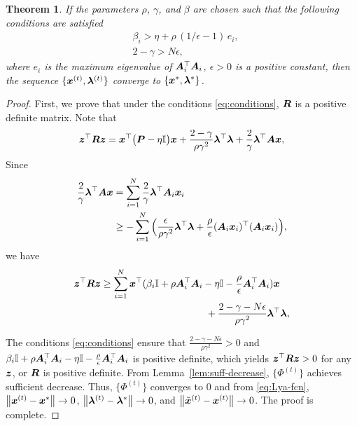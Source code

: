 \documentclass[twocolumn,amsthm]{autart}%
\theoremstyle{definition}
\theoremstyle{plain}
\newtheorem{theorem}{Theorem}
\begin{document}
\begin{theorem}
If the parameters $\rho$, $\gamma$, and $\beta$ are chosen such that the following conditions are satisfied
\begin{equation}
\label{eq:conditions}
\begin{split}
& \beta_i > \eta + \rho\, (1/\epsilon-1)\, e_i, \\
& 2-\gamma > N \epsilon,
\end{split}
\end{equation}
where $e_i$ is the maximum eigenvalue of $\boldsymbol{A}_i^\top \boldsymbol{A}_i$, $\epsilon > 0$ is a positive constant,
then the sequence $\{\boldsymbol{x}^{(t)} , \boldsymbol{\lambda}^{(t)}\}$ converge to $\{\boldsymbol{x}^{*} , \boldsymbol{\lambda}^{*} \}$.
\end{theorem}

\begin{proof}
First, we prove that under the conditions \eqref{eq:conditions}, $\boldsymbol{R}$ is a positive definite matrix.
Note that 
\begin{equation}
\boldsymbol{z}^\top \boldsymbol{R} \boldsymbol{z} = 
\boldsymbol{x}^\top \big(\boldsymbol{P} - \eta \mathbb{I} \big) \boldsymbol{x} 
+ \frac{2-\gamma}{\rho \gamma^2} \boldsymbol{\lambda}^\top \boldsymbol{\lambda} 
+ \frac{2}{\gamma} \boldsymbol{\lambda}^\top \boldsymbol{A} \boldsymbol{x},
\end{equation}
Since 
\begin{equation}
\begin{split}
\frac{2}{\gamma} \boldsymbol{\lambda}^\top \boldsymbol{A} \boldsymbol{x} 
&= \sum_{i=1}^N \frac{2}{\gamma} \boldsymbol{\lambda}^\top \boldsymbol{A}_i \boldsymbol{x}_i \\
& \ge - \sum_{i=1}^N \Big( \frac{\epsilon}{\rho \gamma^2} \boldsymbol{\lambda}^\top \boldsymbol{\lambda} 
+ \frac{\rho}{\epsilon} (\boldsymbol{A}_i \boldsymbol{x}_i)^\top (\boldsymbol{A}_i \boldsymbol{x}_i) \Big),
\end{split}
\end{equation}
we have 
\begin{equation}
\begin{multlined}
\bbsym{z}^\top \bbsym{R} \bbsym{z}
\ge \sum_{i=1}^N \bbsym{x}^\top (\beta_i \II + \rho \bbsym{A}_i^\top \bbsym{A}_i - \eta \II - \frac{\rho}{\epsilon} \bbsym{A}_i^\top \bbsym{A}_i) \bbsym{x} \\
+ \frac{2 - \gamma - N \epsilon}{\rho \gamma^2} \bbsym{\lambda}^\top \bbsym{\lambda},
\end{multlined}
\end{equation}

The conditions \eqref{eq:conditions} ensure that $\frac{2 - \gamma - N \epsilon}{\rho \gamma^2} > 0$ and $\beta_i \mathbb{I} + \rho \boldsymbol{A}_i^\top \boldsymbol{A}_i - \eta \mathbb{I} - \frac{\rho}{\epsilon} \boldsymbol{A}_i^\top \boldsymbol{A}_i$ is positive definite, which yields $\boldsymbol{z}^\top \boldsymbol{R} \boldsymbol{z} > 0$ for any $\boldsymbol{z}$, or $\boldsymbol{R}$ is positive definite.
From Lemma~\ref{lem:suff-decrease}, $\{\Phi^{(t)}\}$ achieves sufficient decrease.
Thus, $\{\Phi^{(t)}\}$ converges to $0$ and from \eqref{eq:Lya-fcn}, $\left\lVert \boldsymbol{x}^{(t)}-\boldsymbol{x}^{*} \right\rVert \rightarrow 0$, $\left\lVert \boldsymbol{\lambda}^{(t)}-\boldsymbol{\lambda}^{*} \right\rVert \rightarrow 0$, and $\left\lVert \Tilde{\boldsymbol{x}}^{(t)} - \boldsymbol{x}^{(t)} \right\rVert \rightarrow 0$. The proof is complete.
\end{proof}
\end{document}
